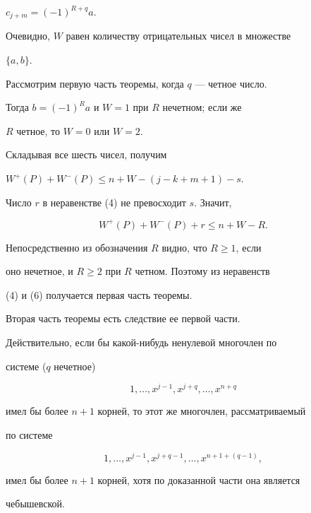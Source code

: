 \begin{pf}
$c_{j+m}=(-1)^{R+q}a$. 


Очевидно, $W$ равен количеству отрицательных чисел в множестве 


$\{a,b\}$. 


Рассмотрим первую часть теоремы, когда $q$ --- четное число. 


Тогда $b=(-1)^R a$ и $W=1$ при $R$ нечетном; если же 


$R$ четное, то $W=0$ или $W=2$. 


 


Складывая все шесть чисел, получим 


$W^+(P)+W^-(P)\le n+W-(j-k+m+1)-s$. 


Число $r$ в неравенстве (4) не превосходит $s$. Значит, 


\begin{equation} 


W^+(P)+W^-(P)+r\le n+W-R. 


\end{equation} 


 


Непосредственно из обозначения $R$ видно, что $R\ge 1$, если 


оно нечетное, и $R\ge 2$ при $R$ четном. Поэтому из неравенств 


(4) и (6) получается первая часть теоремы. 


 


Вторая часть теоремы есть следствие ее первой части. 


Действительно, если бы какой-нибудь ненулевой многочлен по 


системе ($q$ нечетное) 


$$ 


1,\dotsc,x^{j-1},x^{j+q},\dotsc,x^{n+q} 


$$ 


имел бы более $n+1$ корней, то этот же многочлен, рассматриваемый 


по системе 


$$ 


1,\dotsc,x^{j-1},x^{j+q-1},\dotsc,x^{n+1+(q-1)},


$$ 


имел бы более $n+1$ корней, хотя по доказанной части она является 


чебышевской. 


\end{pf} 


